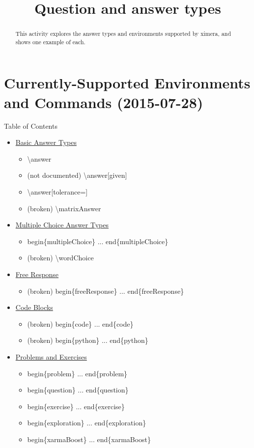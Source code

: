 \documentclass{ximera}
\title{Question and answer types}
\begin{document}
\begin{abstract}
  This activity explores the answer types and environments supported by ximera, and shows one example of each.
\end{abstract}

\maketitle

\section{Currently-Supported Environments and Commands (2015-07-28)}

\begin{remark} Table of Contents

\begin{itemize}
\item \hyperref[BasicAnswerType]{Basic Answer Types}
  \begin{itemize}
    \item \textbackslash answer
    \item (not documented) \textbackslash answer[given]
    \item \textbackslash answer[tolerance=]
    \item (broken) \textbackslash matrixAnswer  
  \end{itemize}
\item \hyperref[MCAnswerType]{Multiple Choice Answer Types}
  \begin{itemize}
    \item begin\{multipleChoice\} ... end\{multipleChoice\}
    \item (broken) \textbackslash wordChoice
  \end{itemize}    
\item \hyperref[FRAnswerType]{Free Response}
  \begin{itemize}   
    \item (broken) begin\{freeResponse\} ... end\{freeResponse\}
  \end{itemize}
\item \hyperref[CodeAnswers]{Code Blocks}
  \begin{itemize}
    \item (broken) begin\{code\} ... end\{code\}
    \item (broken) begin\{python\} ... end\{python\}
  \end{itemize}
\item \hyperref[ProblemContainers]{Problems and Exercises}
  \begin{itemize}
    \item begin\{problem\} ... end\{problem\}
    \item begin\{question\} ... end\{question\}
    \item begin\{exercise\} ... end\{exercise\}
    \item begin\{exploration\} ... end\{exploration\}
    \item begin\{xarmaBoost\} ... end\{xarmaBoost\}
  \end{itemize}
\end{itemize}


\end{remark}
\end{document}
